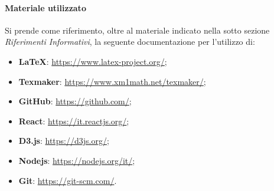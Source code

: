 \paragraph{Materiale utilizzato}
Si prende come riferimento, oltre al materiale indicato nella sotto sezione \textit{Riferimenti Informativi}, la seguente documentazione per l'utilizzo di: 
\begin{itemize}
\item\textbf{\LaTeX}: \textcolor{blue}{\url{https://www.latex-project.org/}};
\item\textbf{Texmaker}: \textcolor{blue}{\url{https://www.xm1math.net/texmaker/}};
\item\textbf{GitHub}: \textcolor{blue}{\url{https://github.com/}};
\item\textbf{React}: \textcolor{blue}{\url{https://it.reactjs.org/}};
\item\textbf{D3.js}: \textcolor{blue}{\url{https://d3js.org/}};
\item\textbf{Nodejs}: \textcolor{blue}{\url{https://nodejs.org/it/}};
\item\textbf{Git}: \textcolor{blue}{\url{https://git-scm.com/}}.
\end{itemize}